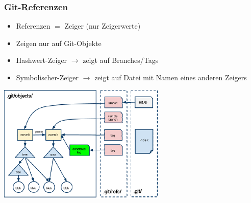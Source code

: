 \subsubsection{Git-Referenzen}
\begin{minipage}{10cm}
	\begin{itemize}
		\item Referenzen $=$ Zeiger (nur Zeigerwerte)
		\item Zeigen nur auf Git-Objekte
		\item Hashwert-Zeiger $\rightarrow$ zeigt auf Branches/Tags
		\item Symbolischer-Zeiger $\rightarrow$ zeigt auf Datei mit Namen eines anderen Zeigers
	\end{itemize}
\end{minipage}
\begin{minipage}{8cm}
	\includegraphics[width=8cm]{images/git-referenz.png}
\end{minipage}
